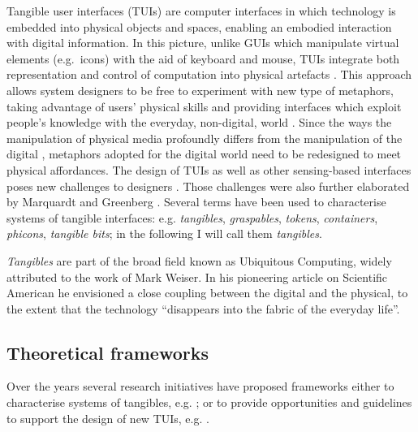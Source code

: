 Tangible user interfaces (TUIs) are computer interfaces in which technology is embedded into physical objects and spaces, enabling an embodied interaction with digital information. In this picture, unlike GUIs which manipulate virtual elements (e.g.~icons) with the aid of keyboard and mouse, TUIs integrate both representation and control of computation into physical artefacts \autocite{krumm2009ubiquitous}. This approach allows system designers to be free to experiment with new type of metaphors, taking advantage of users' physical skills and providing interfaces which exploit people's knowledge with the everyday, non-digital, world \autocite{Jacob:2008vm}. Since the ways the manipulation of physical media profoundly differs from the manipulation of the digital \autocite{Terrenghi:2007uv}, metaphors adopted for the digital world need to be redesigned to meet physical affordances. The design of TUIs as well as other sensing-based interfaces poses new challenges to designers \autocite{Bellotti:2002wg}. Those challenges were also further elaborated by Marquardt and Greenberg \autocite*{Marquardt:2012tg}. Several terms have been used to characterise systems of tangible interfaces: e.g. \emph{tangibles}, \emph{graspables}, \emph{tokens}, \emph{containers}, \emph{phicons}, \emph{tangible bits}; in the following I will call them \emph{tangibles}.

\emph{Tangibles} are part of the broad field known as Ubiquitous Computing, widely attributed to the work of Mark Weiser. In his pioneering article on Scientific American \autocite{weiser1991computer} he envisioned a close coupling between the digital and the physical, to the extent that the technology ``disappears into the fabric of the everyday life''.

\subsection{Theoretical frameworks}\label{frameworks}

Over the years several research initiatives have proposed frameworks either to characterise systems of tangibles, e.g. \autocites{Fishkin:2004uv}{Jacob:2008vm}{Hornecker:2006uq}; or to provide opportunities and guidelines to support the design of new TUIs, e.g. \autocites{Benford:2005bo}{Shaer:2004ta}{Rogers:2006te}.

